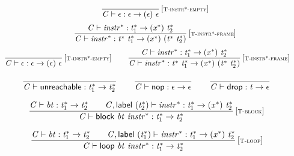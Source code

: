 \documentclass[a4paper]{scrartcl}
\begin{document}
$$
\begin{array}{@{}c@{}}\displaystyle
\frac{
}{
{\mathit{C}} \vdash \epsilon : \epsilon \rightarrow (\epsilon)~\epsilon
} \, {[\textsc{\scriptsize T{-}instr*{-}empty}]}
\\[3ex]\displaystyle
\frac{
{\mathit{C}} \vdash {{\mathit{instr}}^\ast} : {{\mathit{t}}_{{1}}^\ast} \rightarrow ({{\mathit{x}}^\ast})~{{\mathit{t}}_{{2}}^\ast}
}{
{\mathit{C}} \vdash {{\mathit{instr}}^\ast} : {{\mathit{t}}^\ast}~{{\mathit{t}}_{{1}}^\ast} \rightarrow ({{\mathit{x}}^\ast})~({{\mathit{t}}^\ast}~{{\mathit{t}}_{{2}}^\ast})
} \, {[\textsc{\scriptsize T{-}instr*{-}frame}]}
\\[3ex]\displaystyle
\frac{
}{
{\mathit{C}} \vdash \epsilon : \epsilon \rightarrow (\epsilon)~\epsilon
} \, {[\textsc{\scriptsize T{-}instr*{-}empty}]}
\qquad
\frac{
{\mathit{C}} \vdash {{\mathit{instr}}^\ast} : {{\mathit{t}}_{{1}}^\ast} \rightarrow ({{\mathit{x}}^\ast})~{{\mathit{t}}_{{2}}^\ast}
}{
{\mathit{C}} \vdash {{\mathit{instr}}^\ast} : {{\mathit{t}}^\ast}~{{\mathit{t}}_{{1}}^\ast} \rightarrow ({{\mathit{x}}^\ast})~({{\mathit{t}}^\ast}~{{\mathit{t}}_{{2}}^\ast})
} \, {[\textsc{\scriptsize T{-}instr*{-}frame}]}
\qquad
\end{array}
$$

$$
\begin{array}{@{}c@{}}\displaystyle
\frac{
}{
{\mathit{C}} \vdash \mathsf{unreachable} : {{\mathit{t}}_{{1}}^\ast} \rightarrow {{\mathit{t}}_{{2}}^\ast}
}
\qquad
\frac{
}{
{\mathit{C}} \vdash \mathsf{nop} : \epsilon \rightarrow \epsilon
}
\qquad
\frac{
}{
{\mathit{C}} \vdash \mathsf{drop} : {\mathit{t}} \rightarrow \epsilon
}
\qquad
\end{array}
$$

$$
\begin{array}{@{}c@{}}\displaystyle
\frac{
{\mathit{C}} \vdash {\mathit{bt}} : {{\mathit{t}}_{{1}}^\ast} \rightarrow {{\mathit{t}}_{{2}}^\ast}
 \qquad
{\mathit{C}}, \mathsf{label}~({{\mathit{t}}_{{2}}^\ast}) \vdash {{\mathit{instr}}^\ast} : {{\mathit{t}}_{{1}}^\ast} \rightarrow ({{\mathit{x}}^\ast})~{{\mathit{t}}_{{2}}^\ast}
}{
{\mathit{C}} \vdash \mathsf{block}~{\mathit{bt}}~{{\mathit{instr}}^\ast} : {{\mathit{t}}_{{1}}^\ast} \rightarrow {{\mathit{t}}_{{2}}^\ast}
} \, {[\textsc{\scriptsize T{-}block}]}
\qquad
\end{array}
$$

$$
\begin{array}{@{}c@{}}\displaystyle
\frac{
{\mathit{C}} \vdash {\mathit{bt}} : {{\mathit{t}}_{{1}}^\ast} \rightarrow {{\mathit{t}}_{{2}}^\ast}
 \qquad
{\mathit{C}}, \mathsf{label}~({{\mathit{t}}_{{1}}^\ast}) \vdash {{\mathit{instr}}^\ast} : {{\mathit{t}}_{{1}}^\ast} \rightarrow ({{\mathit{x}}^\ast})~{{\mathit{t}}_{{2}}^\ast}
}{
{\mathit{C}} \vdash \mathsf{loop}~{\mathit{bt}}~{{\mathit{instr}}^\ast} : {{\mathit{t}}_{{1}}^\ast} \rightarrow {{\mathit{t}}_{{2}}^\ast}
} \, {[\textsc{\scriptsize T{-}loop}]}
\qquad
\end{array}
$$
\end{document}
